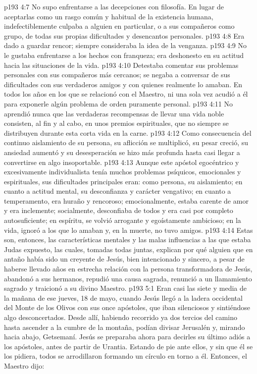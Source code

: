 \vs p193 4:7 No supo enfrentarse a las decepciones con filosofía. En lugar de aceptarlas como un rasgo común y habitual de la existencia humana, indefectiblemente culpaba a alguien en particular, o a sus compañeros como grupo, de todas sus propias dificultades y desencantos personales.
\vs p193 4:8 Era dado a guardar rencor; siempre consideraba la idea de la venganza.
\vs p193 4:9 No le gustaba enfrentarse a los hechos con franqueza; era deshonesto en su actitud hacia las situaciones de la vida.
\vs p193 4:10 Detestaba comentar sus problemas personales con sus compañeros más cercanos; se negaba a conversar de sus dificultades con sus verdaderos amigos y con quienes realmente lo amaban. En todos los años en los que se relacionó con el Maestro, ni una sola vez acudió a él para exponerle algún problema de orden puramente personal.
\vs p193 4:11 No aprendió nunca que las verdaderas recompensas de llevar una vida noble consisten, al fin y al cabo, en unos premios espirituales, que no siempre se distribuyen durante esta corta vida en la carne.
\vs p193 4:12 \pc Como consecuencia del continuo aislamiento de su persona, su aflicción se multiplicó, su pesar creció, su ansiedad aumentó y su desesperación se hizo más profunda hasta casi llegar a convertirse en algo insoportable.
\vs p193 4:13 Aunque este apóstol egocéntrico y excesivamente individualista tenía muchos problemas psíquicos, emocionales y espirituales, sus dificultades principales eran: como persona, su aislamiento; en cuanto a actitud mental, su desconfianza y carácter vengativo; en cuanto a temperamento, era huraño y rencoroso; emocionalmente, estaba carente de amor y era inclemente; socialmente, desconfiaba de todos y era casi por completo autosuficiente; en espíritu, se volvió arrogante y egoístamente ambicioso; en la vida, ignoró a los que lo amaban y, en la muerte, no tuvo amigos.
\vs p193 4:14 Estas son, entonces, las características mentales y las malas influencias a las que estaba Judas expuesto, las cuales, tomadas todas juntas, explican por qué alguien que en antaño había sido un creyente de Jesús, bien intencionado y sincero, a pesar de haberse llevado años en estrecha relación con la persona transformadora de Jesús, abandonó a sus hermanos, repudió una causa sagrada, renunció a un llamamiento sagrado y traicionó a su divino Maestro.
\vs p193 5:1 Eran casi las siete y media de la mañana de ese jueves, 18 de mayo, cuando Jesús llegó a la ladera occidental del Monte de los Olivos con sus once apóstoles, que iban silenciosos y sintiéndose algo desconcertados. Desde allí, habiendo recorrido ya dos tercios del camino hasta ascender a la cumbre de la montaña, podían divisar Jerusalén y, mirando hacia abajo, Getsemaní. Jesús se preparaba ahora para decirles su último adiós a los apóstoles, antes de partir de Urantia. Estando de pie ante ellos, y sin que él se los pidiera, todos se arrodillaron formando un círculo en torno a él. Entonces, el Maestro dijo:
